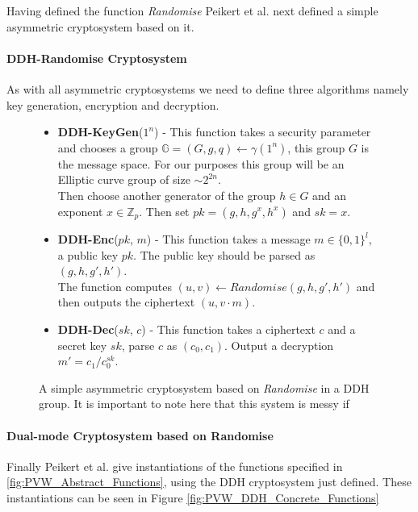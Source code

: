 \documentclass[ %
                    author={Nicholas Tutte},
                supervisor={Prof. Nigel Smart},
                    degree={MEng},
                     title={Secure Two Party Computation},
                  subtitle={A practical comparison of recent protocols},
                      type={Research - GG1K},
                      year={2015} ]{dissertation}
\begin{document}
					Having defined the function \emph{Randomise} Peikert et al. next defined a simple asymmetric cryptosystem based on it.

					\paragraph{DDH-Randomise Cryptosystem} As with all asymmetric cryptosystems we need to define three algorithms namely key generation, encryption and decryption.

					\begin{figure}[!htb]
						\begin{mdframed}
							\centering
							\begin{itemize}
								\item \textbf{DDH-KeyGen}($1^n$) - This function takes a security parameter and chooses a group $\mathbb{G} = (G, g, q) \leftarrow \gamma(1^n)$, this group $G$ is the message space. For our purposes this group will be an Elliptic curve group of size $\sim2^{2n}$.\\[0.25cm]

								Then choose another generator of the group $h \in G$ and an exponent $x \in \mathbb{Z}_p$. Then set $pk = (g, h, g^x, h^x)$ and $sk = x$. 

								\item \textbf{DDH-Enc}($pk$, $m$) - This function takes a message $m \in \{0, 1\}^l$, a public key $pk$. The public key should be parsed as $(g, h, g', h')$.\\[0.25cm]

								The function computes $(u, v) \leftarrow Randomise(g, h, g', h')$ and then outputs the ciphertext $(u, v \cdot m)$.

								\item \textbf{DDH-Dec}($sk$, $c$) - This function takes a ciphertext $c$ and a secret key $sk$, parse $c$ as $(c_0, c_1)$. Output a decryption $m' = c_1 / c_0^{sk}$.

							\end{itemize}
						\end{mdframed}

						\caption{A simple asymmetric cryptosystem based on \emph{Randomise} in a DDH group. It is important to note here that this system is messy if  \label{fig:DDH_Cryptosystem}}
					\end{figure}


					\paragraph{Dual-mode Cryptosystem based on Randomise} Finally Peikert et al. give instantiations of the functions specified in \ref{fig:PVW_Abstract_Functions}, using the DDH cryptosystem just defined. These instantiations can be seen in Figure \ref{fig:PVW_DDH_Concrete_Functions}\\
\end{document}
